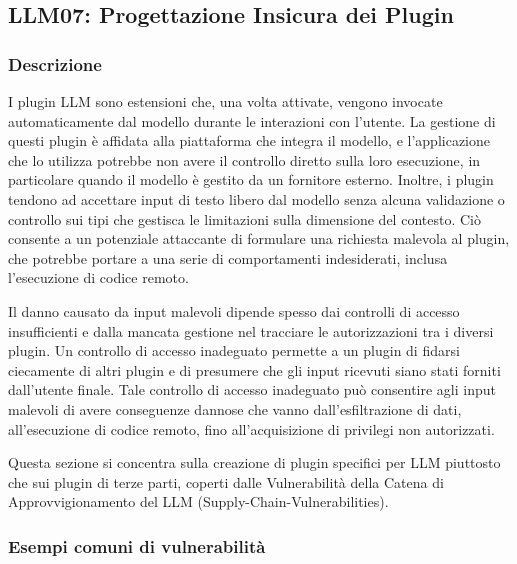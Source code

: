 \documentclass[
]{article}
\author{}
\date{}
\begin{document}
\subsection{LLM07: Progettazione Insicura dei
Plugin}\label{llm07-progettazione-insicura-dei-plugin}

\subsubsection{Descrizione}\label{descrizione}

I plugin LLM sono estensioni che, una volta attivate, vengono invocate
automaticamente dal modello durante le interazioni con l'utente. La
gestione di questi plugin è affidata alla piattaforma che integra il
modello, e l'applicazione che lo utilizza potrebbe non avere il
controllo diretto sulla loro esecuzione, in particolare quando il
modello è gestito da un fornitore esterno. Inoltre, i plugin tendono ad
accettare input di testo libero dal modello senza alcuna validazione o
controllo sui tipi che gestisca le limitazioni sulla dimensione del
contesto. Ciò consente a un potenziale attaccante di formulare una
richiesta malevola al plugin, che potrebbe portare a una serie di
comportamenti indesiderati, inclusa l'esecuzione di codice remoto.

Il danno causato da input malevoli dipende spesso dai controlli di
accesso insufficienti e dalla mancata gestione nel tracciare le
autorizzazioni tra i diversi plugin. Un controllo di accesso inadeguato
permette a un plugin di fidarsi ciecamente di altri plugin e di
presumere che gli input ricevuti siano stati forniti dall'utente finale.
Tale controllo di accesso inadeguato può consentire agli input malevoli
di avere conseguenze dannose che vanno dall'esfiltrazione di dati,
all'esecuzione di codice remoto, fino all'acquisizione di privilegi non
autorizzati.

Questa sezione si concentra sulla creazione di plugin specifici per LLM
piuttosto che sui plugin di terze parti, coperti dalle Vulnerabilità
della Catena di Approvvigionamento del LLM
(Supply-Chain-Vulnerabilities).

\subsubsection{Esempi comuni di
vulnerabilità}\label{esempi-comuni-di-vulnerabilituxe0}
\end{document}
